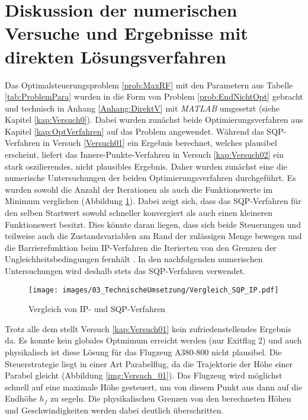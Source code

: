 \section{Diskussion der numerischen Versuche und Ergebnisse mit direkten Lösungsverfahren}
Das Optimalsteuerungsproblem \ref{prob:MaxRF} mit den Parametern aus Tabelle \ref{tab:ProblemPara} wurden in die Form von Problem \ref{prob:EndNichtOpt} gebracht und technisch in Anhang \ref{Anhang:DirektV} mit \textit{MATLAB} umgesetzt (siehe Kapitel \ref{kap:Versuch0}). Dabei wurden zunächst beide Optimierungsverfahren aus Kapitel \ref{kap:OptVerfahren} auf das Problem angewendet. Während das SQP-Verfahren in Versuch \ref{Versuch01} ein Ergebnis berechnet, welches plausibel erscheint, liefert das Innere-Punkte-Verfahren in Versuch \ref{kap:Versuch02} ein stark oszilierendes, nicht plausibles Ergebnis. Daher wurden zunächst eine die numerische Untersuchungen der beiden Optimierungsverfahren durchgeführt. Es wurden sowohl die Anzahl der Iterationen als auch die Funktionswerte im Minimum verglichen (Abbildung \ref{img:Vergleich_SQP_IP}). Dabei zeigt sich, dass das SQP-Verfahren für den selben Startwert sowohl schneller konvergiert als auch einen kleineren Funktionswert besitzt. Dies könnte daran liegen, dass sich beide Steuerungen und teilweise auch die Zustandsvariablen am Rand der zulässigen Menge bewegen und die Barrierefunktion beim IP-Verfahren die Iterierten von den Grenzen der Ungleichheitsbedingungen fernhält \cite{Matlab2016}. In den nachfolgenden numerischen Untersuchungen wird deshalb stets das SQP-Verfahren verwendet.
\begin{figure}[H]
    \begin{center}
        \texttt{[image: images/03\_TechnischeUmsetzung/Vergleich\_SQP\_IP.pdf]}
        \caption{Vergleich von IP- und SQP-Verfahren}\label{img:Vergleich_SQP_IP}
    \end{center}
\end{figure}
Trotz alle dem stellt Versuch \ref{kap:Versuch01} kein zufriedenstellendes Ergebnis da. Es konnte kein globales Optmimum erreicht werden (nur Exitflag 2) und auch physikalisch ist diese Lösung für das Flugzeug A380-800 nicht plausibel. Die Steuerstrategie liegt in einer Art Parabelflug, da die Trajektorie der Höhe einer Parabel gleicht (Abbildung \ref{img:Versuch_01}). Das Flugzeug wird möglichst schnell auf eine maximale Höhe gesteuert, um von diesem Punkt aus dann auf die Endhöhe $h_f$ zu segeln. Die physikalischen Grenzen von den berechneten Höhen und Geschwindigkeiten werden dabei deutlich überschritten.

